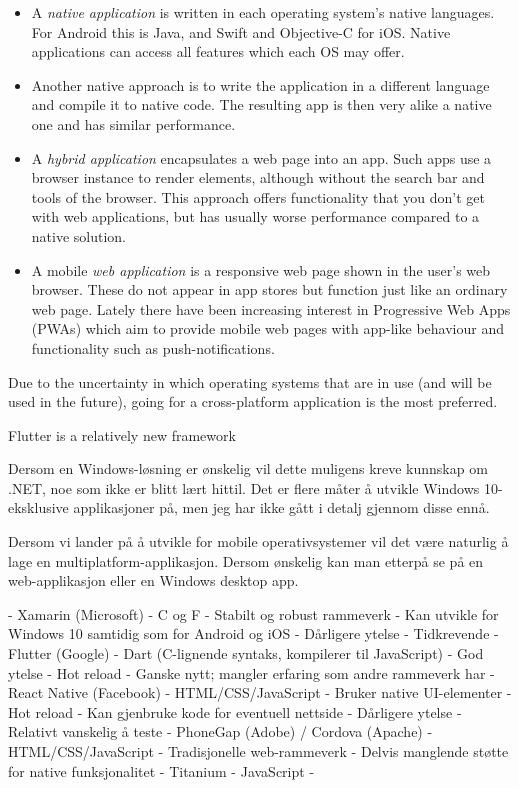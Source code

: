 \begin{itemize}
    \item A \emph{native application} is written in each operating system's native languages. For Android this is Java, and Swift and Objective-C for iOS. Native applications can access all features which each OS may offer.
    \item Another native approach is to write the application in a different language and compile it to native code. The resulting app is then very alike a native one and has similar performance.
    \item A \emph{hybrid application} encapsulates a web page into an app. Such apps use a browser instance to render elements, although without the search bar and tools of the browser. This approach offers functionality that you don't get with web applications, but has usually worse performance compared to a native solution.
    \item A mobile \emph{web application} is a responsive web page shown in the user's web browser. These do not appear in app stores but function just like an ordinary web page. Lately there have been increasing interest in Progressive Web Apps (PWAs) which aim to provide mobile web pages with app-like behaviour and functionality such as push-notifications.
\end{itemize}

Due to the uncertainty in which operating systems that are in use (and will be used in the future), going for a cross-platform application is the most preferred. 

Flutter is a relatively new framework

Dersom en Windows-løsning er ønskelig vil dette muligens kreve kunnskap om .NET, noe som ikke er blitt lært hittil. Det er flere måter å utvikle Windows 10-eksklusive applikasjoner på, men jeg har ikke gått i detalj gjennom disse ennå.

Dersom vi lander på å utvikle for mobile operativsystemer vil det være naturlig å lage en multiplatform-applikasjon. Dersom ønskelig kan man etterpå se på en web-applikasjon eller en Windows desktop app.

- Xamarin (Microsoft)
	- C og F
	- Stabilt og robust rammeverk
	- Kan utvikle for Windows 10 samtidig som for Android og iOS
	- Dårligere ytelse
	- Tidkrevende
- Flutter (Google)
	- Dart (C-lignende syntaks, kompilerer til JavaScript)
	- God ytelse
	- Hot reload
	- Ganske nytt; mangler erfaring som andre rammeverk har
- React Native (Facebook)
	- HTML/CSS/JavaScript
	- Bruker native UI-elementer
	- Hot reload
	- Kan gjenbruke kode for eventuell nettside
	- Dårligere ytelse
	- Relativt vanskelig å teste
- PhoneGap (Adobe) / Cordova (Apache)
    - HTML/CSS/JavaScript
    - Tradisjonelle web-rammeverk
    - Delvis manglende støtte for native funksjonalitet
- Titanium
    - JavaScript
    - 

